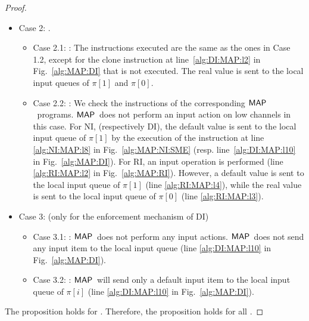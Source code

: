 \documentclass[10pt,a4paper,oneside]{article}
\def\sanserif#1{\ensuremath{\sf #1}}
\def\MAP{\ensuremath{\sanserif{MAP}}}
\def\Prog{\ensuremath{\pi}}
\def\Progl#1{\ensuremath{\Prog[#1]}}
\begin{document}
\begin{proof}
\begin{itemize}
\item Case 2: .
	\begin{itemize}
	\item Case 2.1: : The instructions executed are the same as the ones in Case 1.2, except for the clone instruction at line~\ref{alg:DI:MAP:l2} in Fig.~\ref{alg:MAP:DI} that is not executed. The real value is sent to the local input queues of  \Progl{1} and \Progl{0}.
	
	\item Case 2.2: : We check the instructions of the corresponding \MAP\ programs. \MAP\ does not perform an input action on low channels in this case. For NI, (respectively DI), the default value is sent to the local input queue of \Progl{1} by the execution of the instruction at line \ref{alg:NI:MAP:l8} in Fig.~\ref{alg:MAP:NI:SME} (resp. line~\ref{alg:DI:MAP:l10} in Fig.~\ref{alg:MAP:DI}). For RI, an input operation is performed (line \ref{alg:RI:MAP:l2} in Fig.~\ref{alg:MAP:RI}). However, a default value is sent to the local input queue of \Progl{1} (line \ref{alg:RI:MAP:l4}), while the real value is sent to the local input queue of \Progl{0} (line \ref{alg:RI:MAP:l3}).
	\end{itemize}
	
\item Case 3:  (only for the enforcement mechanism of DI)
	\begin{itemize}
	\item Case 3.1: : \MAP\ does not perform any input actions. \MAP\ does not send any input item to the local input queue (line \ref{alg:DI:MAP:l10} in Fig.~\ref{alg:MAP:DI}).
	\item Case 3.2: : \MAP\ will send only a default input item to the local input queue of \Progl{i} (line \ref{alg:DI:MAP:l10} in Fig.~\ref{alg:MAP:DI}).
	\end{itemize}

\end{itemize}

The proposition holds for . Therefore, the proposition holds for all .
\end{proof}
\end{document}
